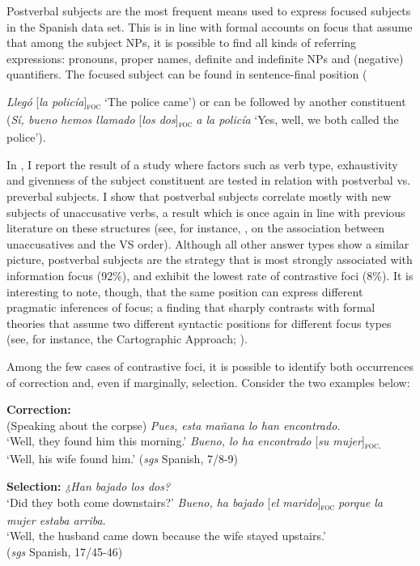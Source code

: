 Postverbal subjects are the most frequent means used to express focused subjects in the Spanish data set. This is in line with formal accounts on focus that assume that among the subject NPs, it is possible to find all kinds of referring expressions: pronouns, proper names, definite and indefinite NPs and (negative) quantifiers. The focused subject can be found in sentence-final position ({\textit{Llegó} {[\textit{la policía}]}\textsubscript{\textsc{foc}} \normalsize `The police came')  or can be followed by another constituent ({\textit{Sí, bueno hemos llamado} {[\textit{los dos}}]\textsubscript{\textsc{foc}}} \normalsize \textit{a la policía} `Yes, well, we both called the police').

In , I report the result of a study where factors such as verb type, exhaustivity and givenness of the subject constituent are tested in relation with postverbal vs. preverbal subjects. I show that postverbal subjects correlate mostly with new subjects of unaccusative verbs, a result which is once again in line with previous literature on these structures (see, for instance, \cite{burzio1986italian}, on the association between unaccusatives and the VS order). 
Although all other answer types show a similar picture, postverbal subjects are the strategy that is most strongly associated with information focus (92\%), and exhibit the lowest rate of contrastive foci (8\%). It is interesting to note, though, that the same position can express different pragmatic inferences of focus; a finding that sharply contrasts with formal theories that assume two different syntactic positions for different focus types (see, for instance, the Cartographic Approach; \cite{rizzi1997fine}). 

Among the few cases of contrastive foci, it is possible to identify both occurrences of correction and, even if marginally, selection. Consider the two examples below:

 \ea \label{ex:3:16} \textbf{Correction:}\\
 (Speaking about the corpse)
\ea \textit{Pues, esta mañana lo han encontrado.}\\
 ‘Well, they found him this morning.'
 \textit{Bueno, lo ha encontrado} {[\textit{su mujer}]\textsubscript{\textsc{foc.}}}\normalsize\\
‘Well, his wife found him.' \hfill (\textit{sgs} Spanish, 7/8-9)   
\z \z 

 \ea \label{ex:3:17} \textbf{Selection:}
\ea \textit{¿Han bajado los dos?}\\
 ‘Did they both come downstairs?'
\ex \textit{Bueno, ha bajado} {[\textit{el marido}]\textsubscript{\textsc{foc}}} \normalsize \textit{porque la mujer estaba arriba}.\\
‘Well, the husband came down because the wife stayed upstairs.' \\
\hfill (\textit{sgs} Spanish, 17/45-46)   
\z \z 


}
